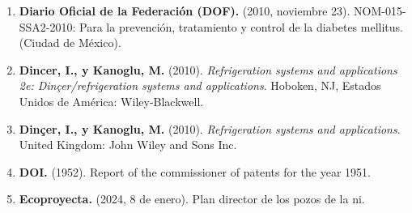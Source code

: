 \documentclass{article}
\begin{document}
\begin{multicols}{2}
\begin{enumerate}[label=\arabic*.]
\item \begin{flushleft} \textbf{Diario Oficial de la Federación (DOF).} (2010, noviembre 23). NOM-015-SSA2-2010: Para la prevención, tratamiento y control de la diabetes mellitus. (Ciudad de México). \end{flushleft}
\item \begin{flushleft} \textbf{Dincer, I., y Kanoglu, M.} (2010). \textit{Refrigeration systems and applications 2e: Dinçer/refrigeration systems and applications}. Hoboken, NJ, Estados Unidos de América: Wiley-Blackwell. \end{flushleft}
\item \begin{flushleft} \textbf{Dinçer, I., y Kanoglu, M.} (2010). \textit{Refrigeration systems and applications}. United Kingdom: John Wiley and Sons Inc. \end{flushleft}
\item \begin{flushleft} \textbf{DOI.} (1952). Report of the commissioner of patents for the year 1951. \end{flushleft}
\item \begin{flushleft} \textbf{Ecoproyecta.} (2024, 8 de enero). Plan director de los pozos de la ni. \end{flushleft}
\end{enumerate}

\end{multicols}
\end{document}
